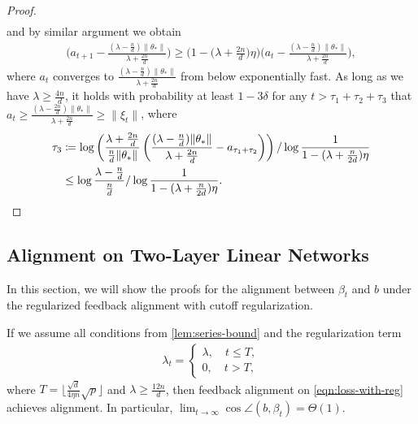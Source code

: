 \begin{proof}
\begin{align*}
    \end{align*}
    and by similar argument we obtain
    \begin{align*}
        \Big(a_{t+1} - \frac{(\lambda - \frac{n}{d})\|\theta_*\|}{\lambda + \frac{2n}{d}}\Big) \geq  \Big(1-\Big(\lambda + \frac{2n}{d}\Big)\eta \Big) \Big(a_t - \frac{(\lambda - \frac{n}{d})\|\theta_*\|}{\lambda + \frac{2n}{d}}\Big),
    \end{align*}
    where $a_t$ converges to $\frac{(\lambda - \frac{n}{d})\|\theta_*\|}{\lambda + \frac{2n}{d}}$ from below exponentially fast. 
    As long as we have $\lambda\geq \frac{4n}{d}$, it holds with probability at least $1-3\delta$ for any $t>\tau_1+\tau_2+\tau_3$ that $a_t \geq \frac{(\lambda - \frac{2n}{d})\|\theta_*\|}{\lambda + \frac{2n}{d}} \geq \|\xi_t\|$, where 
    \begin{align*}
        \tau_3 & \coloneqq \log\left(\frac{\lambda+\frac{2n}{d}}{\frac{n}{d}\|\theta_*\|} \left(\frac{(\lambda - \frac{n}{d})\|\theta_*\|}{\lambda + \frac{2n}{d}} - a_{\tau_1+\tau_2}\right)\right)/\log\frac{1}{1 - (\lambda+\frac{n}{2d})\eta} \\
        & \leq \log\frac{\lambda-\frac{n}{d}}{\frac{n}{d}}/\log\frac{1}{1 - (\lambda+\frac{n}{2d})\eta}.
    \end{align*}
\end{proof}

\subsection{Alignment on Two-Layer Linear Networks}

In this section, we will show the proofs for the alignment between $\beta_t$ and $b$ under the regularized feedback alignment with cutoff regularization.

\begin{theorem}\label{thm:alignment}
    If we assume all conditions from \cref{lem:series-bound}  and the regularization term
    \begin{align*}
        \lambda_t = 
        \begin{cases}
            \lambda, \quad t\leq T,\\
            0, \quad t > T,
        \end{cases}
    \end{align*}
    where $T = \lfloor \frac{\sqrt{d}}{4\eta n}\sqrt{p} \rfloor$ and $\lambda \geq \frac{12n}{d}$,
    then feedback alignment on \eqref{eqn:loss-with-reg} achieves alignment. In particular, $\lim_{t\to\infty} \cos\angle(b, \beta_t) = \Theta(1)$.
\end{theorem}

